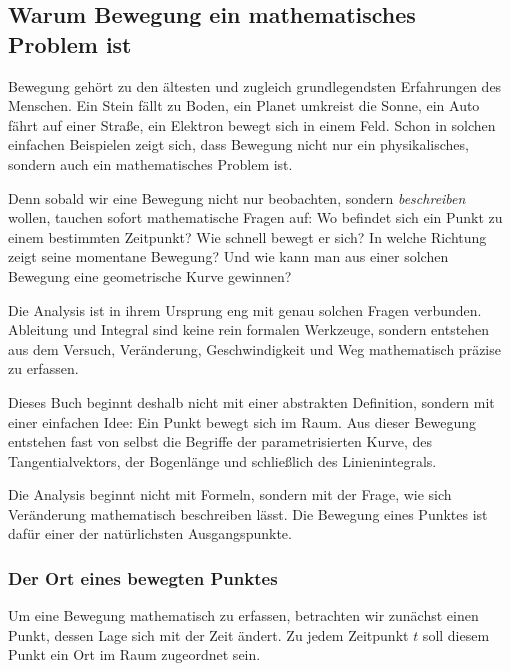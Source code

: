 
\subsection{Warum Bewegung ein mathematisches Problem ist}

Bewegung gehört zu den ältesten und zugleich grundlegendsten Erfahrungen des Menschen.
Ein Stein fällt zu Boden, ein Planet umkreist die Sonne, ein Auto fährt auf einer Straße,
ein Elektron bewegt sich in einem Feld. Schon in solchen einfachen Beispielen zeigt sich,
dass Bewegung nicht nur ein physikalisches, sondern auch ein mathematisches Problem ist.

Denn sobald wir eine Bewegung nicht nur beobachten, sondern \emph{beschreiben} wollen,
tauchen sofort mathematische Fragen auf:
Wo befindet sich ein Punkt zu einem bestimmten Zeitpunkt?
Wie schnell bewegt er sich?
In welche Richtung zeigt seine momentane Bewegung?
Und wie kann man aus einer solchen Bewegung eine geometrische Kurve gewinnen?

Die Analysis ist in ihrem Ursprung eng mit genau solchen Fragen verbunden.
Ableitung und Integral sind keine rein formalen Werkzeuge, sondern entstehen aus dem Versuch,
Veränderung, Geschwindigkeit und Weg mathematisch präzise zu erfassen.

Dieses Buch beginnt deshalb nicht mit einer abstrakten Definition, sondern mit einer einfachen Idee:
Ein Punkt bewegt sich im Raum.
Aus dieser Bewegung entstehen fast von selbst die Begriffe der parametrisierten Kurve,
des Tangentialvektors, der Bogenlänge und schließlich des Linienintegrals.

\begin{DidacticBox}
	Die Analysis beginnt nicht mit Formeln, sondern mit der Frage,
	wie sich Veränderung mathematisch beschreiben lässt.
	Die Bewegung eines Punktes ist dafür einer der natürlichsten Ausgangspunkte.
\end{DidacticBox}


\subsubsection*{Der Ort eines bewegten Punktes}
Um eine Bewegung mathematisch zu erfassen, betrachten wir zunächst einen Punkt,
dessen Lage sich mit der Zeit ändert.
Zu jedem Zeitpunkt \(t\) soll diesem Punkt ein Ort im Raum zugeordnet sein.

